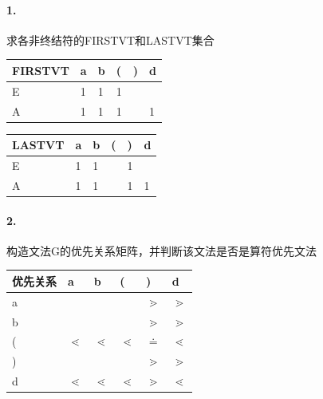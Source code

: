 \documentclass[UTF8]{ctexart} %
\begin{document}
\paragraph{1.} 求各非终结符的FIRSTVT和LASTVT集合

\begin{table}[H]
    \centering
    \begin{tabular}{|p{2cm}<{\centering}|p{1cm}<{\centering}|p{1cm}<{\centering}|p{1cm}<{\centering}|p{1cm}<{\centering}|p{1cm}<{\centering}|}
        \hline
        FIRSTVT & a & b & ( & ) & d \\
        \hline
        E       & 1 & 1 & 1 &   &   \\
        \hline
        A       & 1 & 1 & 1 &   & 1 \\
        \hline
    \end{tabular}
\end{table}

\begin{table}[H]
    \centering
    \begin{tabular}{|p{2cm}<{\centering}|p{1cm}<{\centering}|p{1cm}<{\centering}|p{1cm}<{\centering}|p{1cm}<{\centering}|p{1cm}<{\centering}|}
        \hline
        LASTVT & a & b & ( & ) & d \\
        \hline
        E      & 1 & 1 &   & 1 &   \\
        \hline
        A      & 1 & 1 &   & 1 & 1 \\
        \hline
    \end{tabular}
\end{table}

\paragraph{2.} 构造文法G的优先关系矩阵，并判断该文法是否是算符优先文法

\begin{table}[H]
    \centering
    \begin{tabular}{|p{2cm}<{\centering}|p{1cm}<{\centering}|p{1cm}<{\centering}|p{1cm}<{\centering}|p{1cm}<{\centering}|p{1cm}<{\centering}|}
        \hline
        优先关系 & a          & b          & (          & )         & d          \\
        \hline
        a    &            &            &            & $\gtrdot$ & $\gtrdot$  \\
        \hline
        b    &            &            &            & $\gtrdot$ & $\gtrdot$  \\
        \hline
        (    & $\lessdot$ & $\lessdot$ & $\lessdot$ & $\doteq$  & $\lessdot$ \\
        \hline
        )    &            &            &            & $\gtrdot$ & $\gtrdot$  \\
        \hline
        d    & $\lessdot$ & $\lessdot$ & $\lessdot$ & $\gtrdot$ & $\lessdot$ \\
        \hline
    \end{tabular}
\end{table}
\end{document}
